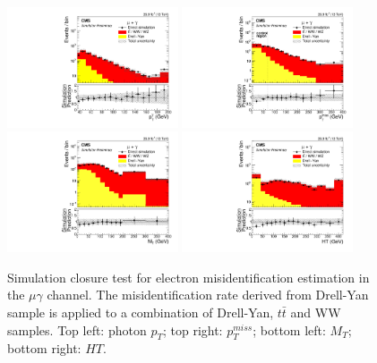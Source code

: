 \documentclass[thesis.tex]{subfiles}
\renewcommand\_{\textunderscore\allowbreak}
\begin{document}
\begin{figure}[hbtp]
  \centering
    \includegraphics[width=0.45\textwidth]{Fig/closure_elefakepho_PhotonEt_mg.pdf}
    \includegraphics[width=0.45\textwidth]{Fig/closure_elefakepho_MET_mg.pdf}
    \includegraphics[width=0.45\textwidth]{Fig/closure_elefakepho_MT_mg.pdf}
    \includegraphics[width=0.45\textwidth]{Fig/closure_elefakepho_HT_mg.pdf}
  \caption{Simulation closure test for electron misidentification estimation in the $\mu\gamma$ channel. The misidentification rate derived from Drell-Yan sample is applied to a combination of Drell-Yan, $t\bar{t}$ and WW samples. Top left: photon $p_T$; top right: $p_T^{miss}$; bottom left: $M_T$; bottom right: $HT$.}
  \label{fig:efakephoclosure_mg}
\end{figure}
\end{document}
